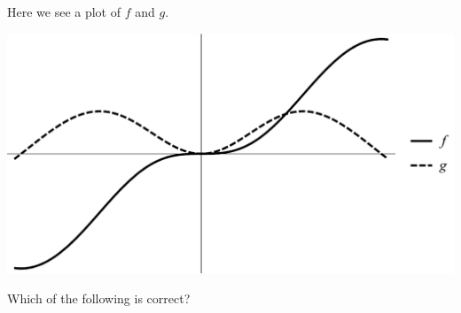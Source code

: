 \documentclass{ximera}
\author{Bart Snapp}
\begin{document}
\begin{exercise}
Here we see a plot of $f$ and $g$. 
\begin{image}
\includegraphics[width=.5\textwidth]{graphFandG3.png}
\end{image}
Which of the following is correct?
\begin{multipleChoice}
\end{multipleChoice}
\end{exercise}
\end{document}
